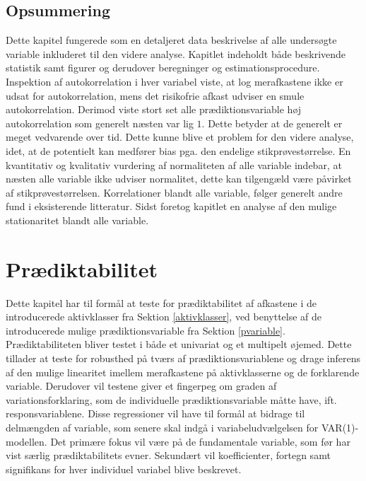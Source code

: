 \documentclass[
  a4paper,
  oneside]{memoir}
\begin{document}
\begin{table}[H]
\begin{threeparttable}
\begin{tablenotes}
\end{tablenotes}
\end{threeparttable}
\end{table}

\hypertarget{ops}{%
\section{Opsummering}\label{ops}}

Dette kapitel fungerede som en detaljeret data beskrivelse af alle undersøgte variable inkluderet til den videre analyse. Kapitlet indeholdt både beskrivende statistik samt figurer og derudover beregninger og estimationsprocedure. Inspektion af autokorrelation i hver variabel viste, at log merafkastene ikke er udsat for autokorrelation, mens det risikofrie afkast udviser en smule autokorrelation. Derimod viste stort set alle prædiktionsvariable høj autokorrelation som generelt næsten var lig \(1\). Dette betyder at de generelt er meget vedvarende over tid. Dette kunne blive et problem for den videre analyse, idet, at de potentielt kan medfører bias pga. den endelige stikprøvestørrelse. En kvantitativ og kvalitativ vurdering af normaliteten af alle variable indebar, at næsten alle variable ikke udviser normalitet, dette kan tilgengæld være påvirket af stikprøvestørrelsen. Korrelationer blandt alle variable, følger generelt andre fund i eksisterende litteratur. Sidst foretog kapitlet en analyse af den mulige stationaritet blandt alle variable.

\hypertarget{predikta}{%
\chapter{Prædiktabilitet}\label{predikta}}

Dette kapitel har til formål at teste for prædiktabilitet af afkastene i de introducerede aktivklasser fra Sektion \ref{aktivklasser}, ved benyttelse af de introducerede mulige prædiktionsvariable fra Sektion \ref{pvariable}. Prædiktabiliteten bliver testet i både et univariat og et multipelt øjemed. Dette tillader at teste for robusthed på tværs af prædiktionsvariablene og drage inferens af den mulige linearitet imellem merafkastene på aktivklasserne og de forklarende variable. Derudover vil testene giver et fingerpeg om graden af variationsforklaring, som de individuelle prædiktionsvariable måtte have, ift. responsvariablene. Disse regressioner vil have til formål at bidrage til delmængden af variable, som senere skal indgå i variabeludvælgelsen for VAR(1)-modellen. Det primære fokus vil være på de fundamentale variable, som før har vist særlig prædiktabilitets evner. Sekundært vil koefficienter, fortegn samt signifikans for hver individuel variabel blive beskrevet.
\end{document}
